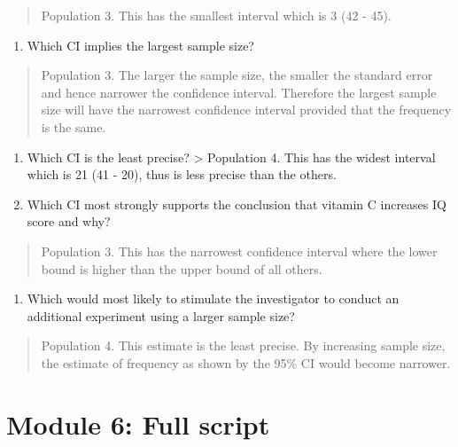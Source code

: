 \documentclass[
]{memoir}
\providecommand{\tightlist}{%
  \setlength{\itemsep}{0pt}\setlength{\parskip}{0pt}}
\begin{document}
\begin{quote}
Population 3. This has the smallest interval which is 3 (42 - 45).
\end{quote}

\begin{enumerate}
\def\labelenumi{\alph{enumi})}
\setcounter{enumi}{1}
\tightlist
\item
  Which CI implies the largest sample size?
\end{enumerate}

\begin{quote}
Population 3. The larger the sample size, the smaller the standard error and hence narrower the confidence interval. Therefore the largest sample size will have the narrowest confidence interval provided that the frequency is the same.
\end{quote}

\begin{enumerate}
\def\labelenumi{\alph{enumi})}
\setcounter{enumi}{2}
\item
  Which CI is the least precise?
  \textgreater{} Population 4. This has the widest interval which is 21 (41 - 20), thus is less precise than the others.
\item
  Which CI most strongly supports the conclusion that vitamin C increases IQ score and why?
\end{enumerate}

\begin{quote}
Population 3. This has the narrowest confidence interval where the lower bound is higher than the upper bound of all others.
\end{quote}

\begin{enumerate}
\def\labelenumi{\alph{enumi})}
\setcounter{enumi}{4}
\tightlist
\item
  Which would most likely to stimulate the investigator to conduct an additional experiment using a larger sample size?
\end{enumerate}

\begin{quote}
Population 4. This estimate is the least precise. By increasing sample size, the estimate of frequency as shown by the 95\% CI would become narrower.
\end{quote}

\hypertarget{module-6-full-script}{%
\chapter*{Module 6: Full script}\label{module-6-full-script}}
\end{document}
